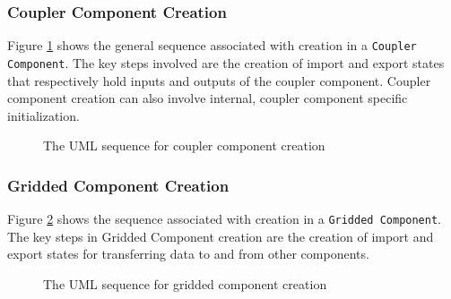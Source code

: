 \subsubsection{Coupler Component Creation}
Figure \ref{fig:CouplerComponentCreate} shows the general sequence associated 
with creation in a {\tt Coupler Component}. The key steps involved are
the creation of import and export states that respectively hold inputs and
outputs of the coupler component. Coupler component creation can also involve 
internal, coupler component specific initialization.

\begin{figure}
\caption[{Coupler Component Create}]
{The UML sequence for coupler component creation}
\label{fig:CouplerComponentCreate}
\end{figure}

\subsubsection{Gridded Component Creation}
Figure \ref{fig:GriddedComponentCreate} shows the sequence associated with
creation in a {\tt Gridded Component}. The key steps in Gridded Component
creation are the creation of import and export states for transferring 
data to and from other components.

\begin{figure}
\caption[{Gridded Component Create}]
{The UML sequence for gridded component creation}
\label{fig:GriddedComponentCreate}
\end{figure}

